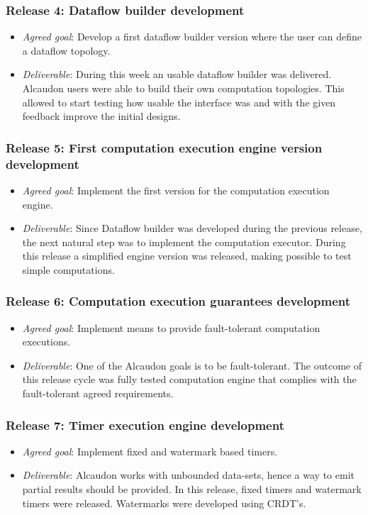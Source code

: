 \subsubsection{Release 4: Dataflow builder development}
\begin{itemize}
\item \textit{Agreed goal}: Develop a first dataflow builder version where the
  user can define a dataflow topology.
\item \textit{Deliverable}: During this week an usable dataflow builder was
  delivered. Alcaudon users were able to build their own computation topologies.
  This allowed to start testing how usable the interface was and with the given
  feedback improve the initial designs.
\end{itemize}

\subsubsection{Release 5: First computation execution engine version development}
\begin{itemize}
\item \textit{Agreed goal}: Implement the first version for the computation
  execution engine.
\item \textit{Deliverable}: Since Dataflow builder was developed during the previous
  release, the next natural step was to implement the computation executor.
  During this release a simplified engine version was released, making possible
  to test simple computations.
\end{itemize}

\subsubsection{Release 6: Computation execution guarantees development}
\begin{itemize}
\item \textit{Agreed goal}: Implement means to provide fault-tolerant computation executions.
\item \textit{Deliverable}: One of the Alcaudon goals is to be fault-tolerant.
  The outcome of this release cycle was fully tested computation engine that
  complies with the fault-tolerant agreed requirements.
\end{itemize}

\subsubsection{Release 7: Timer execution engine development}
\begin{itemize}
\item \textit{Agreed goal}: Implement fixed and watermark based timers.
\item \textit{Deliverable}: Alcaudon works with unbounded data-sets, hence a way
  to emit partial results should be provided. In this release, fixed timers and watermark
  timers were released. Watermarks were developed using CRDT's.
\end{itemize}


